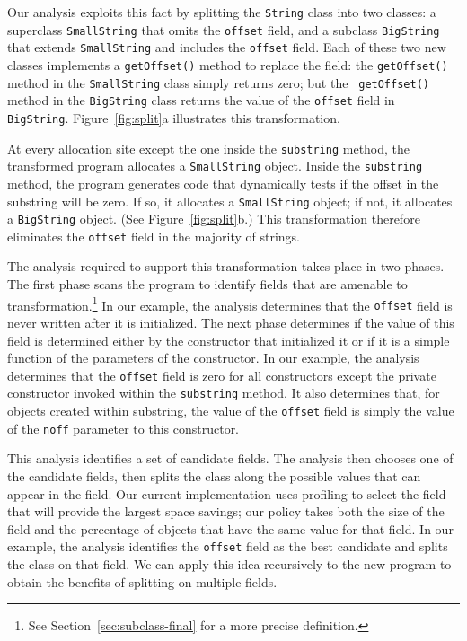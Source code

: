\documentclass[oribibl]{llncs}
\begin{document}
Our analysis exploits this fact by splitting the 
{\tt String} class into two classes: a superclass {\tt SmallString}
that omits the {\tt offset} field, and a subclass {\tt BigString} that
extends {\tt SmallString} and includes the {\tt offset} field. 
Each of these two new classes implements a {\tt getOffset()} method
to replace the field: the {\tt getOffset()} method
in the {\tt SmallString} class simply returns zero; but the {\tt
getOffset()} method in the {\tt BigString} class returns the 
value of the {\tt offset} field in {\tt BigString}.
Figure~\ref{fig:split}a illustrates this transformation.

At every allocation site except the one inside the {\tt substring}
method, the transformed program allocates a {\tt SmallString} 
object. Inside the {\tt substring} method, the program generates
code that dynamically tests if the offset in the substring
will be zero. If so, it allocates a {\tt SmallString} object;
if not, it allocates a {\tt BigString} object.
(See Figure~\ref{fig:split}b.)
This transformation
therefore eliminates the {\tt offset} field in the majority
of strings. 

The analysis required to support this transformation takes place
in two phases. The first phase scans the program
to identify fields that
are amenable to transformation.\footnote{See
  Section~\ref{sec:subclass-final} for a more precise definition.}
In our example, the analysis
determines that the {\tt offset} field is never written after
it is initialized. The next phase determines if the value
of this field is determined either by the constructor that
initialized it or if it is a simple function of the parameters
of the constructor. In our example, the analysis determines
that the {\tt offset} field is zero for all constructors
except the private constructor invoked within the {\tt substring}
method. It also determines that, for objects created within substring,
the value of the {\tt offset} field is simply
the value of the {\tt noff} parameter to this constructor. 

This analysis identifies a set of candidate fields. 
The analysis then chooses one of the candidate fields, then 
splits the class along the possible values
that can appear in the field. Our current implementation uses
profiling to select the field that will provide the largest
space savings; our policy takes both the size of the field
and the percentage of objects that have the same value for 
that field. In our example, the analysis identifies the 
{\tt offset} field as the best candidate and splits the class
on that field. We can apply this idea recursively to the 
new program to obtain the benefits of splitting on multiple
fields. 
\end{document}
